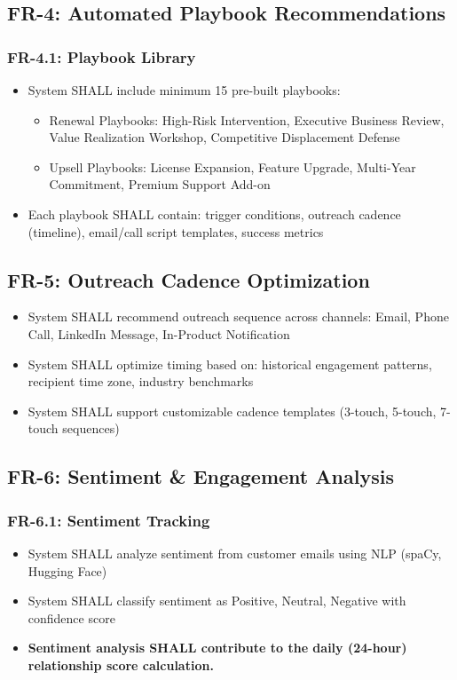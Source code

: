 \documentclass[12pt,a4paper]{article}
\begin{document}
\subsection{FR-4: Automated Playbook Recommendations}
\subsubsection{FR-4.1: Playbook Library}
\begin{itemize}
    \item System SHALL include minimum 15 pre-built playbooks:
    \begin{itemize}
        \item Renewal Playbooks: High-Risk Intervention, Executive Business Review, Value Realization Workshop, Competitive Displacement Defense
        \item Upsell Playbooks: License Expansion, Feature Upgrade, Multi-Year Commitment, Premium Support Add-on
    \end{itemize}
    \item Each playbook SHALL contain: trigger conditions, outreach cadence (timeline), email/call script templates, success metrics
\end{itemize}

\subsection{FR-5: Outreach Cadence Optimization}
\begin{itemize}
    \item System SHALL recommend outreach sequence across channels: Email, Phone Call, LinkedIn Message, In-Product Notification
    \item System SHALL optimize timing based on: historical engagement patterns, recipient time zone, industry benchmarks
    \item System SHALL support customizable cadence templates (3-touch, 5-touch, 7-touch sequences)
\end{itemize}

\subsection{FR-6: Sentiment \& Engagement Analysis}
\subsubsection{FR-6.1: Sentiment Tracking}
\begin{itemize}
    \item System SHALL analyze sentiment from customer emails using NLP (spaCy, Hugging Face)
    \item System SHALL classify sentiment as Positive, Neutral, Negative with confidence score
    \item \textbf{Sentiment analysis SHALL contribute to the daily (24-hour) relationship score calculation.}
\end{itemize}
\end{document}
